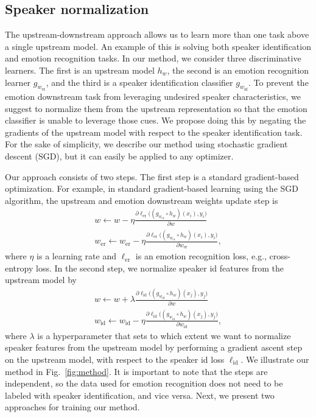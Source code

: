 \documentclass{article}
\newcommand{\ger}{g_{w_{\text{er}}}}
\newcommand{\gid}{g_{w_{\text{id}}}}
\renewcommand{\[}{\begin{eqnarray}}
\renewcommand{\]}{\end{eqnarray}}
\begin{document}
\subsection{Speaker normalization}

The upstream-downstream approach allows us to learn more than one task above a single upstream model. An example of this is solving both speaker identification and emotion recognition tasks. In our method, we consider three discriminative learners. The first is an upstream model $h_w$, the second is an emotion recognition learner $\ger$, and the third is a speaker identification classifier $\gid$. To prevent the emotion downstream task from leveraging undesired speaker characteristics, we suggest to normalize them from the upstream representation so that the emotion classifier is unable to leverage those cues. We propose doing this by negating the gradients of the upstream model with respect to the speaker identification task. For the sake of simplicity, we describe our method using stochastic gradient descent (SGD), but it can easily be applied to any optimizer.

Our approach consists of two steps. The first step is a standard gradient-based optimization. For example, in standard gradient-based learning using the SGD algorithm, the upstream and emotion downstream weights update step is 
\[
    w \leftarrow w - \eta\frac{\partial \ell_{\text{er}}\big((\ger \circ h_{w})(x_i),y_i \big)}{\partial w} \\
    w_{\text{er}} \leftarrow w_{\text{er}} - \eta\frac{\partial \ell_{\text{er}}\big((\ger \circ h_{w})(x_i),y_i\big)}{\partial w_{\text{er}}},
\]
where $\eta$ is a learning rate and $\ell_{\text{er}}$ is an emotion recognition loss, e.g., cross-entropy loss. In the second step, we normalize speaker id features from the upstream model by
\[
    w \leftarrow w + \lambda\frac{\partial \ell_{\text{id}}\big((\gid \circ h_{w})(x_j),y_{j}\big)}{\partial w}\label{eq:id_dis} \\
    w_{\text{id}} \leftarrow w_{\text{id}} - \eta\frac{\partial \ell_{\text{id}}\big((\gid \circ h_{w})(x_j),y_{j}\big)}{\partial w_{\text{id}}},
\]
where $\lambda$ is a hyperparameter that sets to which extent we want to normalize speaker features from the upstream model by performing a gradient ascent step on the upstream model, with respect to the speaker id loss $\ell_{\text{id}}$. We illustrate our method in Fig.~\ref{fig:method}. It is important to note that the steps are independent, so the data used for emotion recognition does not need to be labeled with speaker identification, and vice versa. Next, we present two approaches for training our method.
\end{document}
